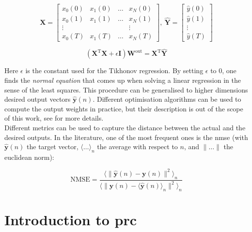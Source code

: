 \begin{equation}
	\mathbf{X} = \begin{bmatrix}
			x_0(0) & x_1(0) & \dots & x_N(0)\\
			x_0(1) & x_1(1) & \dots & x_N(1)\\
			\vdots & & & \vdots \\
			x_0(T) & x_1(T) & \dots & x_N(T)			
	\end{bmatrix},~ \hat{\mathbf{Y}} = \begin{bmatrix}
		\hat{y}(0)\\
		\hat{y}(1)\\
		\vdots \\
		\hat{y}(T)
	\end{bmatrix}
\end{equation} 

\begin{equation}
	\left(\mathbf{X}^{\text{T}} \mathbf{X}+\epsilon \mathbf{I} \right) \mathbf{W}^{\text{out}} = \mathbf{X}^{\text{T}} \hat{\mathbf{Y}}
\end{equation}

Here $\epsilon$ is the constant used for the Tikhonov regression. By setting $\epsilon$ to 0, one finds the \textit{normal equation} that comes up when solving a linear regression \cite{Goudarzi2014ACS} in the sense of the least squares. This procedure can be generalised to higher dimensions desired output vectors $\hat{\mathbf{y}}(n)$. Different optimisation algorithms can be used to compute the output weights in practice, but their description is out of the scope of this work, see \cite{Lukoeviius2009} for more details.\\

Different metrics can be used to capture the distance between the actual and the desired outputs. In the literature, one of the most frequent ones is the \gls{nmse} \cite{Duport2016} (with $\hat{\mathbf{y}}(n)$ the target vector, $\langle \dots \rangle _n$ the average with respect to $n$, and $\| \dots \|$ the euclidean norm):

\begin{equation}
	\text{NMSE} = \frac{\langle \| \hat{\mathbf{y}}(n) - \mathbf{y}(n)\|^2 \rangle _n}{\langle \| \hat{\mathbf{y}}(n) - \langle \hat{\mathbf{y}}(n) \rangle _n \|^2 \rangle _n}
\end{equation}


\section{Introduction to \acrlong{prc}}

